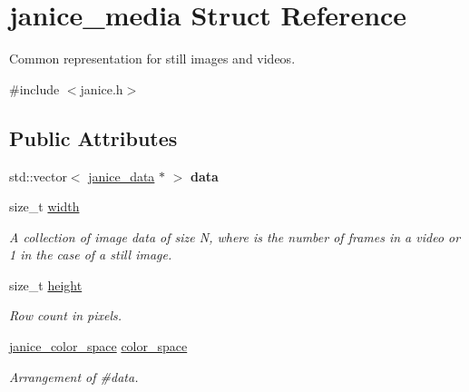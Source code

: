 \hypertarget{structjanice__media}{}\section{janice\+\_\+media Struct Reference}
\label{structjanice__media}


Common representation for still images and videos.  




{\ttfamily \#include $<$janice.\+h$>$}

\subsection*{Public Attributes}
\begin{DoxyCompactItemize}
\item 
\hypertarget{structjanice__media_a5db37ee39a03658abe7d17f5b5d7d85c}{}std\+::vector$<$ \hyperlink{group__janice_ga63103e7e1c9df7d7403640223f3f6f07}{janice\+\_\+data} $\ast$ $>$ {\bfseries data}\label{structjanice__media_a5db37ee39a03658abe7d17f5b5d7d85c}

\item 
size\+\_\+t \hyperlink{structjanice__media_a26211ab10bfc184f0e30f8bf19031390}{width}
\begin{DoxyCompactList}\small\item\em A collection of image data of size N, where is the number of frames in a video or 1 in the case of a still image. \end{DoxyCompactList}\item 
\hypertarget{structjanice__media_a80ae69c5b5d4635fd90e75264eafed7e}{}size\+\_\+t \hyperlink{structjanice__media_a80ae69c5b5d4635fd90e75264eafed7e}{height}\label{structjanice__media_a80ae69c5b5d4635fd90e75264eafed7e}

\begin{DoxyCompactList}\small\item\em Row count in pixels. \end{DoxyCompactList}\item 
\hypertarget{structjanice__media_a5b0dc8eaab10e370301f6bc74d8312b1}{}\hyperlink{group__janice_ga4040c8aa81857fc2102f27cf34cd973e}{janice\+\_\+color\+\_\+space} \hyperlink{structjanice__media_a5b0dc8eaab10e370301f6bc74d8312b1}{color\+\_\+space}\label{structjanice__media_a5b0dc8eaab10e370301f6bc74d8312b1}

\begin{DoxyCompactList}\small\item\em Arrangement of \#data. \end{DoxyCompactList}\end{DoxyCompactItemize}


